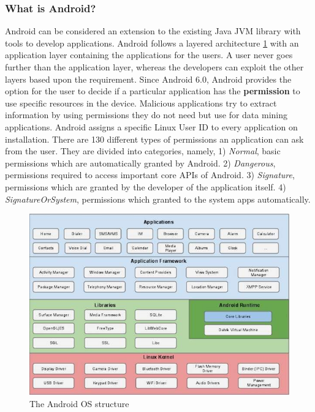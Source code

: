 \documentclass[runningheads]{llncs}
\begin{document}
\subsubsection{What is Android?}
Android can be considered an extension to the existing Java JVM library with tools to develop applications.
Android follows a layered architecture \ref{fig1} with an application layer containing the applications for the users.
A user never goes further than the application layer, whereas the developers can exploit the other layers based upon the requirement.
Since Android 6.0, Android provides the option for the user to decide if a particular application has the \textbf{permission} 
to use specific resources in the device. Malicious applications try to extract information by using permissions they do not need but use for data mining applications. Android assigns a specific Linux User ID to every application on installation. There are 130 different types of permissions an application can ask from the user. They are divided into categories, namely, 1) \textit{Normal}, basic permissions which are automatically granted
by Android. 2) \textit{Dangerous}, permissions required to access important core APIs of Android. 3) \textit{Signature}, permissions which are granted by the developer of the application itself.
4) \textit{SignatureOrSystem}, permissions which granted to the system apps automatically. 
\begin{figure}
    \includegraphics[width=\textwidth]{images/architecture.jpg}
    \caption{The Android OS structure} \label{fig1}
\end{figure}
\end{document}
